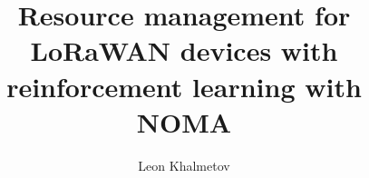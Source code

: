 \documentclass[a4paper, twoside]{report}
\title{Resource management for LoRaWAN devices with reinforcement learning with NOMA}
\author{Leon Khalmetov}
\begin{document}



\renewcommand{\abstractname}{Acknowledgements}
\begin{abstract}
\end{abstract}

\tableofcontents









\end{document}

